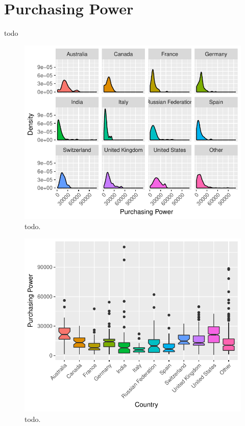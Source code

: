 \documentclass{article}
\begin{document}
\section{Purchasing Power}
todo


\begin{figure}[H]
\centering
\includegraphics{report-016}
\caption{todo.}\label{fig_4}
\end{figure}


\begin{figure}[H]
\centering
\includegraphics{report-017}
\caption{todo.}\label{fig_5}
\end{figure}
\end{document}
